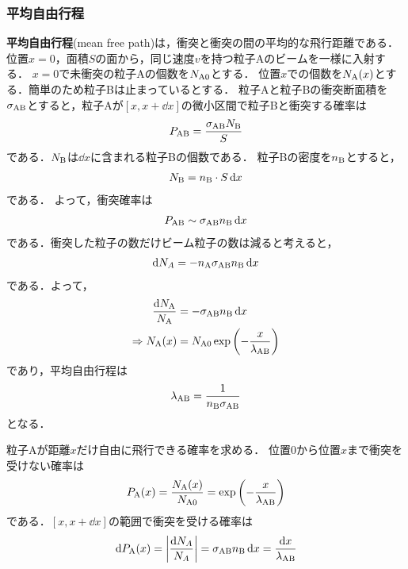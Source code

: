 \documentclass{report}
\begin{document}
      \subsubsection{平均自由行程}
        \textbf{平均自由行程}(mean free path)は，衝突と衝突の間の平均的な飛行距離である．
        位置$x = 0$，面積$S$の面から，同じ速度$v$を持つ粒子Aのビームを一様に入射する．
        $x = 0$で未衝突の粒子Aの個数を$N_{\mathrm{A}0}$とする．
        位置$x$での個数を$N_{\mathrm{A}}(x)$とする．簡単のため粒子Bは止まっているとする．
        粒子Aと粒子Bの衝突断面積を$\sigma_{\mathrm{AB}}$とすると，粒子Aが$[x, x + \dd{x}]$の微小区間で粒子Bと衝突する確率は
        \begin{align}
          P_{\mathrm{AB}} = \frac{\sigma_{\mathrm{AB}}N_{\mathrm{B}}}{S}
        \end{align}
        である．$N_{\mathrm{B}}$は$\dd{x}$に含まれる粒子Bの個数である．
        粒子Bの密度を$n_{\mathrm{B}}$とすると，
        \begin{align}
          N_{\mathrm{B}} = n_{\mathrm{B}}\cdot S \dd{x}
        \end{align}
        である．
        よって，衝突確率は
        \begin{align}
          P_{\mathrm{AB}} \sim \sigma_{\mathrm{AB}} n_{\mathrm{B}} \dd{x}
        \end{align}
        である．衝突した粒子の数だけビーム粒子の数は減ると考えると，
        \begin{align}
          \dd{N_A} = -n_{\mathrm{A}} \sigma_{\mathrm{AB}} n_{\mathrm{B}} \dd{x}
        \end{align}
        である．よって，
        \begin{align}
          \frac{\dd{N_{\mathrm{A}}}}{N_{\mathrm{A}}} &= - \sigma_{\mathrm{AB}} n_{\mathrm{B}} \dd{x}\\
          \Rightarrow N_{\mathrm{A}}(x) &= N_{\mathrm{A0}} \exp\qty(-\frac{x}{\lambda_{\mathrm{AB}}})
        \end{align}
        であり，平均自由行程は
        \begin{align}
          \lambda_{\mathrm{AB}} = \frac{1}{n_{\mathrm{B}} \sigma_{\mathrm{AB}}}
        \end{align}
        となる．
        \par
        粒子Aが距離$x$だけ自由に飛行できる確率を求める．
        位置$0$から位置$x$まで衝突を受けない確率は
        \begin{align}
          P_{\mathrm{A}}(x) = \frac{N_{\mathrm{A}}(x)}{N_{\mathrm{A0}}} = \exp\qty(-\frac{x}{\lambda_{\mathrm{AB}}})
        \end{align}
        である．$[x, x + \dd{x}]$の範囲で衝突を受ける確率は
        \begin{align}
          \dd{P_{\mathrm{A}}(x)} = \abs{\frac{\dd{N_A}}{N_A}} = \sigma_{\mathrm{AB}} n_{\mathrm{B}} \dd{x} = \frac{\dd{x}}{\lambda_{\mathrm{AB}}}
        \end{align}
\end{document}

